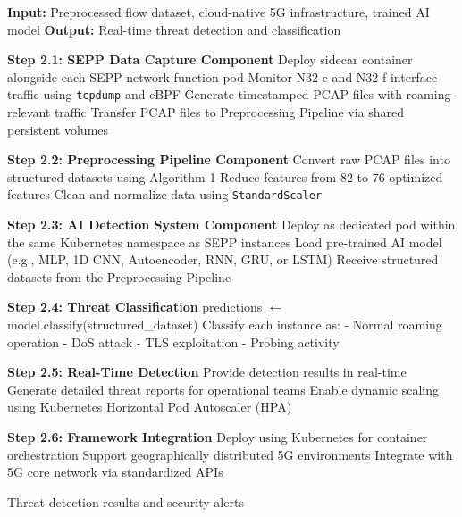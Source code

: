 \documentclass[journal,article,submit,moreauthors,pdftex]{Definitions/tsp}
\begin{document}
\begin{algorithm}[H]
\caption{AI-Driven Intrusion Detection Framework for Cloud-Native 5G Networks}
\label{alg:ai_ids_framework}
\begin{algorithmic}[1]
\State \textbf{Input:} Preprocessed flow dataset, cloud-native 5G infrastructure, trained AI model
\State \textbf{Output:} Real-time threat detection and classification

\State \textbf{Step 2.1: SEPP Data Capture Component}
\State \quad Deploy sidecar container alongside each SEPP network function pod
\State \quad Monitor N32-c and N32-f interface traffic using \texttt{tcpdump} and eBPF
\State \quad Generate timestamped PCAP files with roaming-relevant traffic
\State \quad Transfer PCAP files to Preprocessing Pipeline via shared persistent volumes

\State \textbf{Step 2.2: Preprocessing Pipeline Component}
\State \quad Convert raw PCAP files into structured datasets using Algorithm 1
\State \quad Reduce features from 82 to 76 optimized features
\State \quad Clean and normalize data using \texttt{StandardScaler}

\State \textbf{Step 2.3: AI Detection System Component}
\State \quad Deploy as dedicated pod within the same Kubernetes namespace as SEPP instances
\State \quad Load pre-trained AI model (e.g., MLP, 1D CNN, Autoencoder, RNN, GRU, or LSTM)
\State \quad Receive structured datasets from the Preprocessing Pipeline

\State \textbf{Step 2.4: Threat Classification}
\State \quad predictions $\gets$ model.classify(structured\_dataset)
\State \quad Classify each instance as:
\State \quad \quad - Normal roaming operation
\State \quad \quad - DoS attack
\State \quad \quad - TLS exploitation
\State \quad \quad - Probing activity

\State \textbf{Step 2.5: Real-Time Detection}
\State \quad Provide detection results in real-time
\State \quad Generate detailed threat reports for operational teams
\State \quad Enable dynamic scaling using Kubernetes Horizontal Pod Autoscaler (HPA)

\State \textbf{Step 2.6: Framework Integration}
\State \quad Deploy using Kubernetes for container orchestration
\State \quad Support geographically distributed 5G environments
\State \quad Integrate with 5G core network via standardized APIs

\State \Return Threat detection results and security alerts
\end{algorithmic}
\end{algorithm}
\end{document}

